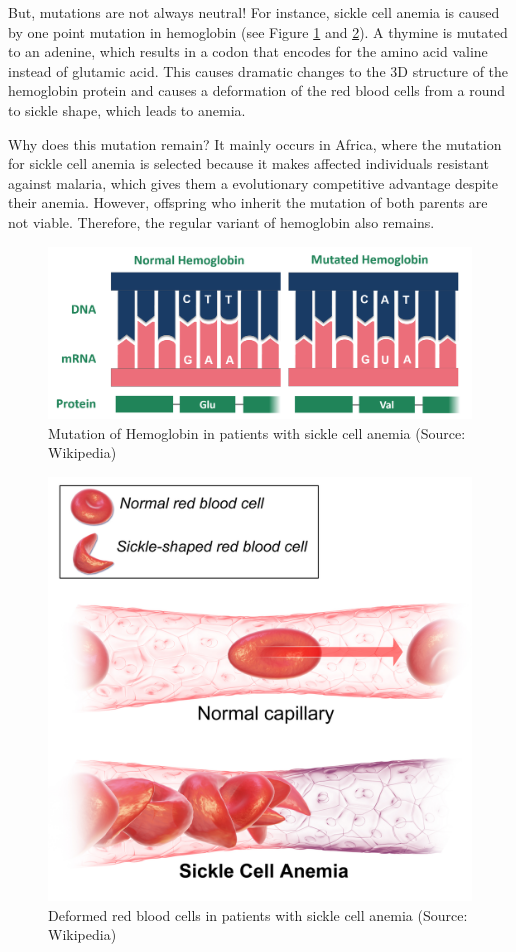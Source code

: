 \documentclass[
  11pt,
]{book}
\begin{document}
But, mutations are not always neutral! For instance, sickle cell anemia is caused by one point mutation in hemoglobin (see Figure \ref{fig:sickleCell1} and \ref{fig:sickleCell2}). A thymine is mutated to an adenine, which results in a codon that encodes for the amino acid valine instead of glutamic acid. This causes dramatic changes to the 3D structure of the hemoglobin protein and causes a deformation of the red blood cells from a round to sickle shape, which leads to anemia.

Why does this mutation remain? It mainly occurs in Africa, where the mutation for sickle cell anemia is selected because it makes affected individuals resistant against malaria, which gives them a evolutionary competitive advantage despite their anemia. However, offspring who inherit the mutation of both parents are not viable. Therefore, the regular variant of hemoglobin also remains.

\begin{figure}

{\centering \includegraphics[width=0.45\linewidth]{./figs/sickleCellWikipedia2} 

}

\caption{Mutation of Hemoglobin in patients with sickle cell anemia (Source: Wikipedia)}\label{fig:sickleCell1}
\end{figure}

\begin{figure}

{\centering \includegraphics[width=0.45\linewidth]{./figs/Sickle_Cell_Anemia_wiki3} 

}

\caption{Deformed red blood cells in patients with sickle cell anemia (Source: Wikipedia)}\label{fig:sickleCell2}
\end{figure}
\end{document}
